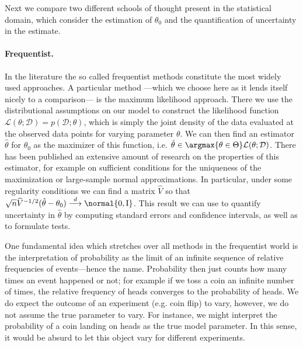 Next we compare two different schools of thought present in the statistical domain, which consider the estimation of $\theta_0$ and the quantification of uncertainty in the estimate.

\paragraph{Frequentist.}
In the literature the so called frequentist methods constitute the most widely used approaches.
A particular method ---which we choose here as it lends itself nicely to a comparison--- is the maximum likelihood approach.
There we use the distributional assumptions on our model to construct the likelihood function $\mathcal{L}(\theta; \mathcal{D}) = p(\mathcal{D}; \theta)$, which is simply the joint density of the data evaluated at the observed data points for varying parameter $\theta$.
We can then find an estimator $\hat{\theta}$ for $\theta_0$ as the maximizer of this function, i.e. $\hat{\theta} \in \argmax{\theta \in \Theta} \mathcal{L}(\theta; \mathcal{D})$.
There has been published an extensive amount of research on the properties of this estimator, for example on sufficient conditions for the uniqueness of the maximization or large-sample normal approximations.
In particular, under some regularity conditions we can find a matrix $\widehat{V}$ so that $\sqrt{n}\widehat{V}^{-1/2}(\hat{\theta} - \theta_0) \overset{d}{\longrightarrow} \normal{0, \mathrm{I}}$.
This result we can use to quantify uncertainty in $\hat{\theta}$ by computing standard errors and confidence intervals, as well as to formulate tests.

One fundamental idea which stretches over all methods in the frequentist world is the interpretation of probability as the limit of an infinite sequence of relative frequencies of events---hence the name.
Probability then just counts how many times an event happened or not; for example if we toss a coin an infinite number of times, the relative frequency of heads converges to the probability of heads.
We do expect the outcome of an experiment (e.g. coin flip) to vary, however, we do not assume the true parameter to vary.
For instance, we might interpret the probability of a coin landing on heads as the true model parameter.
In this sense, it would be absurd to let this object vary for different experiments.

